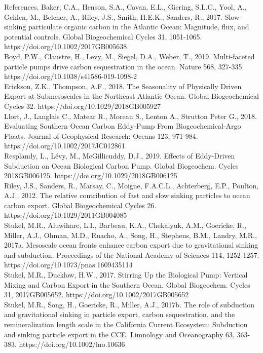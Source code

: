 \documentclass[article,linenumbers]{agujournal2018}
\begin{document}
	References. 
	Baker, C.A., Henson, S.A., Cavan, E.L., Giering, S.L.C., Yool, A., Gehlen, M., Belcher, A., Riley, J.S., Smith, H.E.K., Sanders, R., 2017. Slow-sinking particulate organic carbon in the Atlantic Ocean: Magnitude, flux, and potential controls. Global Biogeochemical Cycles 31, 1051-1065. https://doi.org/10.1002/2017GB005638\\
	Boyd, P.W., Claustre, H., Levy, M., Siegel, D.A., Weber, T., 2019. Multi-faceted particle pumps drive carbon sequestration in the ocean. Nature 568, 327-335. https://doi.org/10.1038/s41586-019-1098-2\\
	Erickson, Z.K., Thompson, A.F., 2018. The Seasonality of Physically Driven Export at Submesoscales in the Northeast Atlantic Ocean. Global Biogeochemical Cycles 32. https://doi.org/10.1029/2018GB005927\\
	Llort, J., Langlais C., Matear R., Moreau S., Lenton A., Strutton Peter G., 2018. Evaluating Southern Ocean Carbon Eddy‐Pump From Biogeochemical‐Argo Floats. Journal of Geophysical Research: Oceans 123, 971-984. https://doi.org/10.1002/2017JC012861\\
	Resplandy, L., Lévy, M., McGillicuddy, D.J., 2019. Effects of Eddy‐Driven Subduction on Ocean Biological Carbon Pump. Global Biogeochem. Cycles 2018GB006125. https://doi.org/10.1029/2018GB006125\\
	Riley, J.S., Sanders, R., Marsay, C., Moigne, F.A.C.L., Achterberg, E.P., Poulton, A.J., 2012. The relative contribution of fast and slow sinking particles to ocean carbon export. Global Biogeochemical Cycles 26. https://doi.org/10.1029/2011GB004085\\
	Stukel, M.R., Aluwihare, L.I., Barbeau, K.A., Chekalyuk, A.M., Goericke, R., Miller, A.J., Ohman, M.D., Ruacho, A., Song, H., Stephens, B.M., Landry, M.R., 2017a. Mesoscale ocean fronts enhance carbon export due to gravitational sinking and subduction. Proceedings of the National Academy of Sciences 114, 1252-1257. https://doi.org/10.1073/pnas.1609435114\\
	Stukel, M.R., Ducklow, H.W., 2017. Stirring Up the Biological Pump: Vertical Mixing and Carbon Export in the Southern Ocean. Global Biogeochem. Cycles 31, 2017GB005652. https://doi.org/10.1002/2017GB005652\\
	Stukel, M.R., Song, H., Goericke, R., Miller, A.J., 2017b. The role of subduction and gravitational sinking in particle export, carbon sequestration, and the remineralization length scale in the California Current Ecosystem: Subduction and sinking particle export in the CCE. Limnology and Oceanography 63, 363-383. https://doi.org/10.1002/lno.10636\\
	
\end{document}
